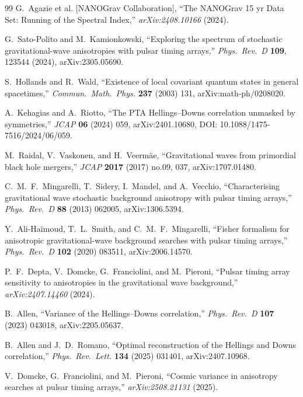 \documentclass[11pt,a4paper]{article}
\begin{document}
\begin{thebibliography}{99}
G.~Agazie et al. [NANOGrav Collaboration],
``The NANOGrav 15 yr Data Set: Running of the Spectral Index,''
\textit{arXiv:2408.10166} (2024).

G.~Sato-Polito and M.~Kamionkowski,
``Exploring the spectrum of stochastic gravitational-wave anisotropies with pulsar timing arrays,''
\textit{Phys.\ Rev.\ D} \textbf{109}, 123544 (2024), arXiv:2305.05690.

S.~Hollands and R.~Wald,
``Existence of local covariant quantum states in general spacetimes,''
\textit{Commun.\ Math.\ Phys.} \textbf{237} (2003) 131, arXiv:math-ph/0208020.

A.~Kehagias and A.~Riotto,
``The PTA Hellings--Downs correlation unmasked by symmetries,''
\textit{JCAP} \textbf{06} (2024) 059, arXiv:2401.10680, DOI: 10.1088/1475-7516/2024/06/059.

M.~Raidal, V.~Vaskonen, and H.~Veerm\"ae,
``Gravitational waves from primordial black hole mergers,''
\textit{JCAP} \textbf{2017} (2017) no.09, 037, arXiv:1707.01480.

C.~M.~F.~Mingarelli, T.~Sidery, I.~Mandel, and A.~Vecchio,
``Characterising gravitational wave stochastic background anisotropy with pulsar timing arrays,''
\textit{Phys.\ Rev.\ D} \textbf{88} (2013) 062005, arXiv:1306.5394.

Y.~Ali-Ha\"imoud, T.~L.~Smith, and C.~M.~F.~Mingarelli,
``Fisher formalism for anisotropic gravitational-wave background searches with pulsar timing arrays,''
\textit{Phys.\ Rev.\ D} \textbf{102} (2020) 083511, arXiv:2006.14570.

P.~F.~Depta, V.~Domcke, G.~Franciolini, and M.~Pieroni,
``Pulsar timing array sensitivity to anisotropies in the gravitational wave background,''
\textit{arXiv:2407.14460} (2024).

B.~Allen,
``Variance of the Hellings--Downs correlation,''
\textit{Phys.\ Rev.\ D} \textbf{107} (2023) 043018, arXiv:2205.05637.

B.~Allen and J.~D.~Romano,
``Optimal reconstruction of the Hellings and Downs correlation,''
\textit{Phys.\ Rev.\ Lett.} \textbf{134} (2025) 031401, arXiv:2407.10968.

V.~Domcke, G.~Franciolini, and M.~Pieroni,
``Cosmic variance in anisotropy searches at pulsar timing arrays,''
\textit{arXiv:2508.21131} (2025).

\end{thebibliography}
\end{document}
